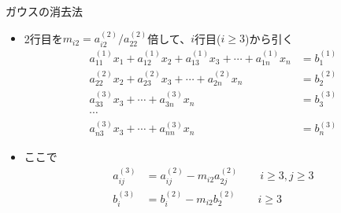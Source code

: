 \begin{frame}[t,fragile]{ガウスの消去法}
  \begin{itemize}
  \item 2行目を$m_{i2} = a_{i2}^{(2)}/a_{22}^{(2)}$倍して、$i$行目($i \ge 3$)から引く
    \begin{align*}
    a_{11}^{(1)} x_1 + a_{12}^{(1)} x_2 + a_{13}^{(1)} x_3 + \cdots + a_{1n}^{(1)} x_n &= b_{1}^{(1)} \\
    a_{22}^{(2)} x_2 + a_{23}^{(2)} x_3 + \cdots + a_{2n}^{(2)} x_n &= b_{2}^{(2)} \\
    a_{33}^{(3)} x_3 + \cdots + a_{3n}^{(3)} x_n &= b_{3}^{(3)} \\
    \cdots \\
    a_{n3}^{(3)} x_3 + \cdots + a_{nn}^{(3)} x_n &= b_{n}^{(3)}
    \end{align*}
  \item ここで
    \begin{align*}
      a_{ij}^{(3)} &= a_{ij}^{(2)} - m_{i2} a_{2j}^{(2)} \qquad i \ge 3, j \ge 3 \\
      b_{i}^{(3)} &= b_{i}^{(2)} - m_{i2} b_{2}^{(2)} \qquad i \ge 3
    \end{align*}
  \end{itemize}
\end{frame}
